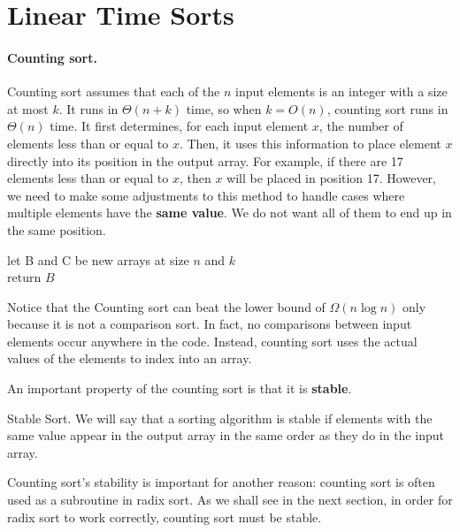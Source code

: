 \section{Linear Time Sorts}
\paragraph{ Counting sort.}
Counting sort assumes that each of the $n$ input elements is an integer with a size at most $k$. It runs in $\Theta(n + k)$ time, so when $k = O(n)$, counting sort runs in $\Theta(n)$ time. It first determines, for each input element $x$, the number of elements less than or equal to $x$. Then, it uses this information to place element $x$ directly into its position in the output array. For example, if there are 17 elements less than or equal to $x$, then $x$ will be placed in position 17. However, we need to make some adjustments to this method to handle cases where multiple elements have the \textbf{same value}. We do not want all of them to end up in the same position.

%
  \begin{algorithm}
  	let B and C be new arrays at size $n$ and $k$ \\ 
	  return $B$
\caption{Counting-sort$(A, n, k)$}
  \end{algorithm}
%

Notice that the Counting sort can beat the lower bound of $\Omega\left(n \log n\right)$ only because it is not a comparison sort. In fact, no comparisons between input elements occur anywhere in the code. Instead, counting sort uses the actual values of the elements to index into an array.

An important property of the counting sort is that it is \textbf{stable}.

\begin{defbox}{Stable Sort.}
 We will say that a sorting algorithm is stable if elements with the same value appear in the output array in the same order as they do in the input array. \end{defbox}

Counting sort's stability is important for another reason: counting sort is often used as a subroutine in radix sort. As we shall see in the next section, in order for radix sort to work correctly, counting sort must be stable.


